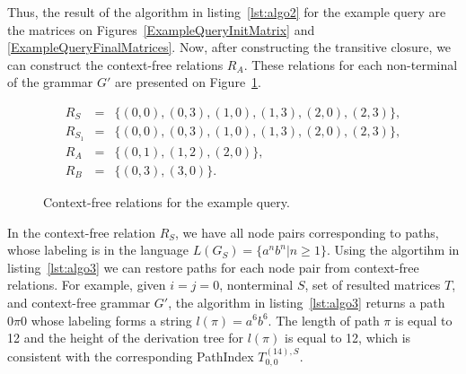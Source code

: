 Thus, the result of the algorithm in listing~\ref{lst:algo2} for the example query are the matrices on Figures~\ref{ExampleQueryInitMatrix} and \ref{ExampleQueryFinalMatrices}. Now, after constructing the transitive closure, we can construct the context-free relations $R_A$. These relations for each non-terminal of the grammar $G'$ are presented on Figure~\ref{ExampleQueryCFRelations}.

\begin{figure}[h]
	\begin{eqnarray*}
		R_S&=&\{(0,0),(0,3),(1,0),(1,3),(2,0),(2,3)\},\\
		R_{S_1}&=&\{(0,0),(0,3),(1,0),(1,3),(2,0),(2,3)\},\\
		R_{A}&=&\{(0,1),(1,2),(2,0)\}, \\
		R_{B}&=&\{(0,3), (3,0)\}.
	\end{eqnarray*}
	\caption{Context-free relations for the example query.}
	\label{ExampleQueryCFRelations}
\end{figure}

In the context-free relation $R_S$, we have all node pairs corresponding to paths, whose labeling is in the language $L(G_S) = \{a^n b^n| n \geq 1\}$. Using the algortihm in listing~\ref{lst:algo3} we can restore paths for each node pair from context-free relations. For example, given $i=j=0$, nonterminal $S$, set of resulted matrices $T$, and context-free grammar $G'$, the algorithm in listing~\ref{lst:algo3} returns a path $0\pi 0$ whose labeling forms a string $l(\pi) = a^6 b^6$. The length of path $\pi$ is equal to 12 and the height of the derivation tree for $l(\pi)$ is equal to 12, which is consistent with the corresponding PathIndex $T^{(14),S}_{0,0}$.